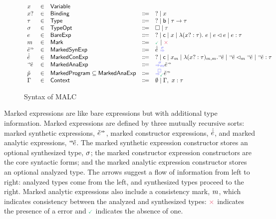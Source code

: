 \begin{figure}
    \[\begin{array}{lcllll}
    \VV & \in & \VName &  & \\ 
    \BV & \in & \BName & \Coloneqq & \EHole \mid \VV \\ 
    \TV & \in & \TName & \Coloneqq & 
        \THole 
        \mid \TBase
        \mid \TArrow{\TV}{\TV} \\ 
    \DV & \in & \DName & \Coloneqq & 
        \DNone
        \mid \DSome{\tau}\\ 
    \BEV & \in & \BEName & \Coloneqq & 
        \BEHole
        \mid \BEConst
        \mid \BEVar{\VV}
        \mid \BELam{\BV}{\TV}{\BEV}
        \mid \BEAp{\BEV}{\BEV}
        \mid \BEAsc{\BEV}{\TV}\\
    \MV & \in & \MName & \Coloneqq & 
        \MGood
        \mid \MBad \\ 
    \MEUV & \in & \MEUName & \Coloneqq & \EUp{\MEMV~}{\DV}\\ 
    \MEMV & \in & \MEMName & \Coloneqq & 
        \EHole
        \mid \EConst
        \mid \EVar{\VV}{\MV}
        \mid \ELam{\BV}{\TV}{\MV}{\MV}{\MELV}
        \mid \EAp{\MELV}{\MV}{\MELV}
        \mid \EAsc{\MELV}{\TV}\\ 
    \MELV & \in & \MELName & \Coloneqq & \ELow{\DV}{\MV}{\MEUV}\\
    \MPV & \in & \MPName \subseteq \MELName & \Coloneqq & \ELow{\DNone}{\MGood}{\MEUV}\\ 
    \ctx & \in & \ctxName & \Coloneqq & 
        \emptyset 
        \mid \extendCtx{\ctx}{\VV}{\TV}\\
    \end{array}\]
    \vspace{-8pt}
    \caption{Syntax of MALC}
    \label{fig:syntax}
\end{figure}



Marked expressions are like bare expressions but with additional type information. 
Marked expressions are defined by three mutually recursive sorts: marked synthetic expressions, $\MEUV$, marked constructor expressions, $\dot{\check{e}}$, and marked analytic expressions, $\MELV$. 
The marked synthetic expression constructor stores an optional synthesized type, $\sigma$; the marked constructor expression constructors are the core syntactic forms; and the marked analytic expression constructor stores an optional analyzed type. 
The arrows suggest a flow of information from left to right: analyzed types come from the left, and synthesized types proceed to the right.
Marked analytic expressions also include a consistency mark, $m$, which indicates consistency between the analyzed and synthesized types: $\MBad$ indicates the presence of a error and $\MGood$ indicates the absence of one.

